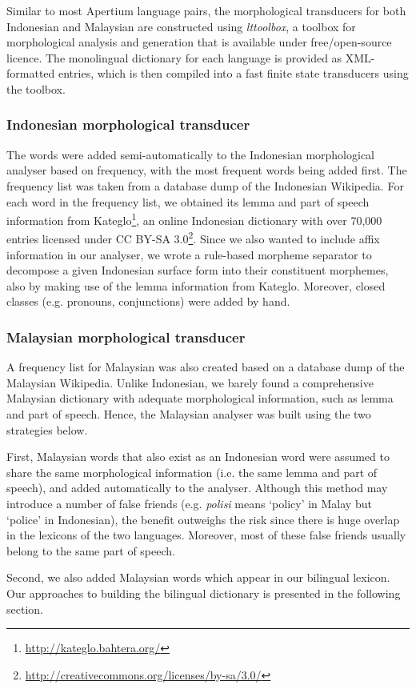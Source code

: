 \documentclass[10pt,a5paper,twoside]{article}
\begin{document}
Similar to most Apertium language pairs, the morphological transducers for both Indonesian and Malaysian are constructed using \emph{lttoolbox}, a toolbox for morphological analysis and generation that is available under free/open-source licence. The monolingual dictionary for each language is provided as XML-formatted entries, which is then compiled into a fast finite state transducers using the toolbox.
\subsubsection{Indonesian morphological transducer}
The words were added semi-automatically to the Indonesian morphological analyser based on frequency, with the most frequent words being added first. The frequency list was taken from a database dump of the Indonesian Wikipedia. For each word in the frequency list, we obtained its lemma and part of speech information from Kateglo\footnote{\url{http://kateglo.bahtera.org/}}, an online Indonesian dictionary with over 70,000 entries licensed under CC BY-SA 3.0\footnote{\url{http://creativecommons.org/licenses/by-sa/3.0/}}. Since we also wanted to include affix information in our analyser, we wrote a rule-based morpheme separator to decompose a given Indonesian surface form into their constituent morphemes, also by making use of the lemma information from Kateglo. Moreover, closed classes (e.g. pronouns, conjunctions) were added by hand.
\subsubsection{Malaysian morphological transducer}
A frequency list for Malaysian was also created based on a database dump of the Malaysian Wikipedia. Unlike Indonesian, we barely found a comprehensive Malaysian dictionary with adequate morphological information, such as lemma and part of speech. Hence, the Malaysian analyser was built using the two strategies below.

First, Malaysian words that also exist as an Indonesian word were assumed to share the same morphological information (i.e. the same lemma and part of speech), and added automatically to the analyser. Although this method may introduce a number of false friends (e.g. \emph{polisi} means `policy' in Malay but `police' in Indonesian), the benefit outweighs the risk since there is huge overlap in the lexicons of the two languages. Moreover, most of these false friends usually belong to the same part of speech.

Second, we also added Malaysian words which appear in our bilingual lexicon. Our approaches to building the bilingual dictionary is presented in the following section.
\end{document}
